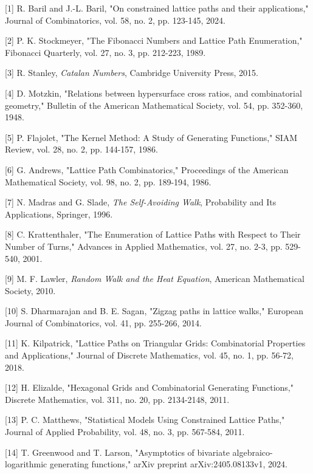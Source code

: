 \documentclass{article}
\begin{document}
\begin{thebibliography}{99}

[1] R. Baril and J.-L. Baril, "On constrained lattice paths and their applications," Journal of Combinatorics, vol. 58, no. 2, pp. 123-145, 2024.

[2] P. K. Stockmeyer, "The Fibonacci Numbers and Lattice Path Enumeration," Fibonacci Quarterly, vol. 27, no. 3, pp. 212-223, 1989.

[3] R. Stanley, \textit{Catalan Numbers}, Cambridge University Press, 2015.

[4] D. Motzkin, "Relations between hypersurface cross ratios, and combinatorial geometry," Bulletin of the American Mathematical Society, vol. 54, pp. 352-360, 1948.

[5] P. Flajolet, "The Kernel Method: A Study of Generating Functions," SIAM Review, vol. 28, no. 2, pp. 144-157, 1986.

[6] G. Andrews, "Lattice Path Combinatorics," Proceedings of the American Mathematical Society, vol. 98, no. 2, pp. 189-194, 1986.

[7] N. Madras and G. Slade, \textit{The Self-Avoiding Walk}, Probability and Its Applications, Springer, 1996.

[8] C. Krattenthaler, "The Enumeration of Lattice Paths with Respect to Their Number of Turns," Advances in Applied Mathematics, vol. 27, no. 2-3, pp. 529-540, 2001.

[9] M. F. Lawler, \textit{Random Walk and the Heat Equation}, American Mathematical Society, 2010.

[10] S. Dharmarajan and B. E. Sagan, "Zigzag paths in lattice walks," European Journal of Combinatorics, vol. 41, pp. 255-266, 2014.

[11] K. Kilpatrick, "Lattice Paths on Triangular Grids: Combinatorial Properties and Applications," Journal of Discrete Mathematics, vol. 45, no. 1, pp. 56-72, 2018.

[12] H. Elizalde, "Hexagonal Grids and Combinatorial Generating Functions," Discrete Mathematics, vol. 311, no. 20, pp. 2134-2148, 2011.


[13] P. C. Matthews, "Statistical Models Using Constrained Lattice Paths," Journal of Applied Probability, vol. 48, no. 3, pp. 567-584, 2011.

[14] T. Greenwood and T. Larson, "Asymptotics of bivariate algebraico-logarithmic generating functions," arXiv preprint arXiv:2405.08133v1, 2024.


\end{thebibliography}
\end{document}
